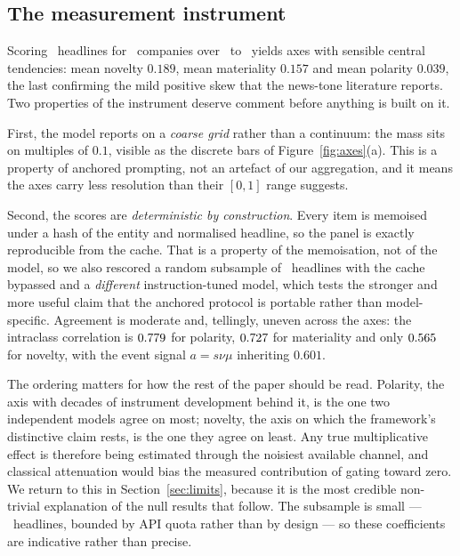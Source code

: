 \subsection{The measurement instrument}\label{sec:reliability}

Scoring \ScoredHeadlines\ headlines for \NCompanies\ companies over
\PanelStart\ to \PanelEnd\ yields axes with sensible central tendencies: mean
novelty $0.189$, mean materiality $0.157$ and mean polarity $0.039$, the last
confirming the mild positive skew that the news-tone literature reports. Two
properties of the instrument deserve comment before anything is built on it.

First, the model reports on a \emph{coarse grid} rather than a continuum: the mass
sits on multiples of $0.1$, visible as the discrete bars of
Figure~\ref{fig:axes}(a). This is a property of anchored prompting, not an
artefact of our aggregation, and it means the axes carry less resolution than
their $[0,1]$ range suggests.

Second, the scores are \emph{deterministic by construction}. Every item is
memoised under a hash of the entity and normalised headline, so the panel is
exactly reproducible from the cache. That is a property of the memoisation, not of
the model, so we also rescored a random subsample of \RetestN\ headlines with the
cache bypassed and a \emph{different} instruction-tuned model, which tests the
stronger and more useful claim that the anchored protocol is portable rather than
model-specific. Agreement is moderate and, tellingly, uneven across the axes:
the intraclass correlation is $0.779$ for polarity, $0.727$ for materiality and
only $0.565$ for novelty, with the event signal $a=s\nu\mu$ inheriting $0.601$.

The ordering matters for how the rest of the paper should be read. Polarity, the
axis with decades of instrument development behind it, is the one two independent
models agree on most; novelty, the axis on which the framework's distinctive claim
rests, is the one they agree on least. Any true multiplicative effect is therefore
being estimated through the noisiest available channel, and classical attenuation
would bias the measured contribution of gating toward zero. We return to this in
Section~\ref{sec:limits}, because it is the most credible non-trivial explanation
of the null results that follow. The subsample is small --- \RetestN\ headlines,
bounded by API quota rather than by design --- so these coefficients are
indicative rather than precise.


